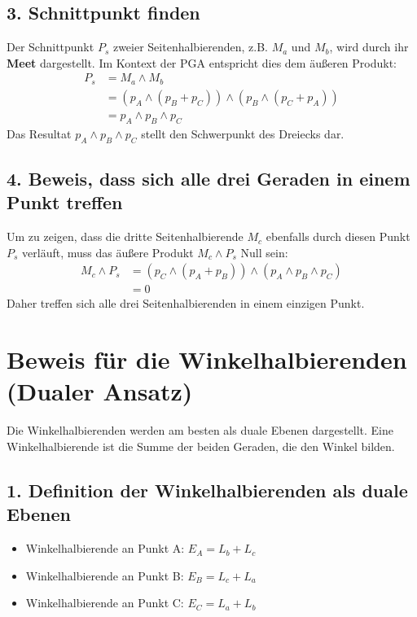 \documentclass{article}
\begin{document}
\subsection*{3. Schnittpunkt finden}
Der Schnittpunkt $P_s$ zweier Seitenhalbierenden, z.B. $M_a$ und $M_b$, wird durch ihr \textbf{Meet} dargestellt. Im Kontext der PGA entspricht dies dem äußeren Produkt:
\begin{align*}
P_s &= M_a \wedge M_b \\
&= (p_A \wedge (p_B + p_C)) \wedge (p_B \wedge (p_C + p_A)) \\
&= p_A \wedge p_B \wedge p_C
\end{align*}
Das Resultat $p_A \wedge p_B \wedge p_C$ stellt den Schwerpunkt des Dreiecks dar.

\subsection*{4. Beweis, dass sich alle drei Geraden in einem Punkt treffen}
Um zu zeigen, dass die dritte Seitenhalbierende $M_c$ ebenfalls durch diesen Punkt $P_s$ verläuft, muss das äußere Produkt $M_c \wedge P_s$ Null sein:
\begin{align*}
M_c \wedge P_s &= (p_C \wedge (p_A + p_B)) \wedge (p_A \wedge p_B \wedge p_C) \\
&= 0
\end{align*}
Daher treffen sich alle drei Seitenhalbierenden in einem einzigen Punkt.

\section{Beweis für die Winkelhalbierenden (Dualer Ansatz)}

Die Winkelhalbierenden werden am besten als duale Ebenen dargestellt. Eine Winkelhalbierende ist die Summe der beiden Geraden, die den Winkel bilden.

\subsection*{1. Definition der Winkelhalbierenden als duale Ebenen}
\begin{itemize}
    \item Winkelhalbierende an Punkt A: $E_A = L_b + L_c$
    \item Winkelhalbierende an Punkt B: $E_B = L_c + L_a$
    \item Winkelhalbierende an Punkt C: $E_C = L_a + L_b$
\end{itemize}
\end{document}
